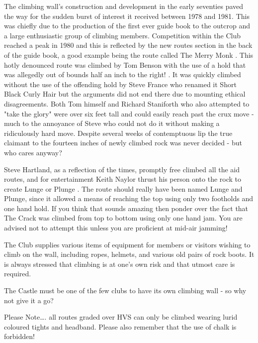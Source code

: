 \documentclass[a5paper,openany,font 10pt]{scrbook}
\begin{document}
The climbing wall's construction and development in the early
seventies paved the way for the sudden burst of interest it received
between 1978 and 1981.  This was chiefly due to the production of the
first ever guide book to the outcrop and a large enthusiastic group of
climbing members. Competition within the Club reached a peak in 1980
and this is reflected by the new routes section in the back of the
guide book, a good example being the route called The Merry Monk .
This hotly denounced route was climbed by Tom Benson with the use of a
hold that was allegedly out of bounds half an inch to the right! . It
was quickly climbed without the use of the offending hold by Steve
France who renamed it Short Black Curly Hair but the arguments did not
end there due to mounting ethical disagreements. Both Tom himself and
Richard Staniforth who also attempted to "take the glory" were over
six feet tall and could easily reach past the crux move - much to the
annoyance of Steve who could not do it without making a ridiculously
hard move. Despite several weeks of contemptuous lip the true claimant
to the fourteen inches of newly climbed rock was never decided - but
who cares anyway?

Steve Hartland, as a reflection of the times, promptly free climbed
all the aid routes, and for entertainment Keith Naylor thrust his
person onto the rock to create Lunge or Plunge . The route should
really have been named Lunge and Plunge, since it allowed a means
of reaching the top using only two footholds and one hand hold. If
you think that sounds amazing then ponder over the fact that The
Crack was climbed from top to bottom using only one hand jam. You
are advised not to attempt this unless you are proficient at
mid-air jamming!

The Club supplies various items of equipment for members or visitors
wishing to climb on the wall, including ropes, helmets, and various
old pairs of rock boots. It is always stressed that climbing is at
one's own risk and that utmost care is required.

The Castle must be one of the few clubs to have its own climbing
wall - so why not give it a go?

Please Note\ldots{}. all routes graded over HVS can only be climbed wearing
lurid coloured tights and headband. Please also remember that the use
of chalk is forbidden!
\end{document}
